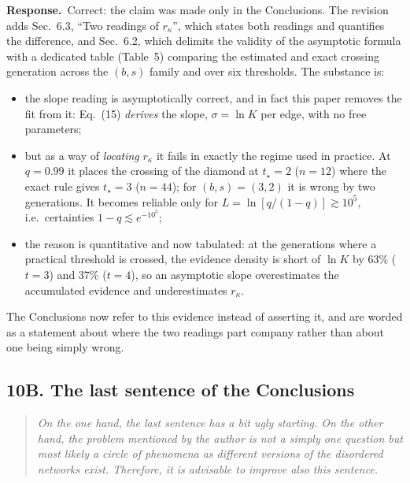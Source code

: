 \documentclass[11pt]{article}
\newcommand{\rk}{r_{\kappa}}
\newenvironment{point}{\begin{quote}\itshape}{\end{quote}}
\newcommand{\reply}{\par\noindent\textbf{Response.}\ }
\begin{document}
\reply Correct: the claim was made only in the Conclusions. The revision adds
Sec.~6.3, ``Two readings of $\rk$'', which states both readings and quantifies
the difference, and Sec.~6.2, which delimits the validity of the asymptotic
formula with a dedicated table (Table~5) comparing the estimated and exact
crossing generation across the $(b,s)$ family and over six thresholds. The
substance is:

\begin{itemize}
\item the slope reading is asymptotically correct, and in fact this paper
      removes the fit from it: Eq.~(15) \emph{derives} the slope, $\sigma=\ln
      K$ per edge, with no free parameters;
\item but as a way of \emph{locating} $\rk$ it fails in exactly the regime used
      in practice. At $q=0.99$ it places the crossing of the diamond at
      $t_\star=2$ ($n=12$) where the exact rule gives $t_\star=3$ ($n=44$); for
      $(b,s)=(3,2)$ it is wrong by two generations. It becomes reliable only
      for $L=\ln[q/(1-q)]\gtrsim10^5$, i.e.\ certainties $1-q\lesssim
      e^{-10^5}$;
\item the reason is quantitative and now tabulated: at the generations where a
      practical threshold is crossed, the evidence density is short of $\ln K$
      by $63\%$ ($t=3$) and $37\%$ ($t=4$), so an asymptotic slope
      overestimates the accumulated evidence and underestimates $\rk$.
\end{itemize}

The Conclusions now refer to this evidence instead of asserting it, and are
worded as a statement about where the two readings part company rather than
about one being simply wrong.

\subsection*{10B. The last sentence of the Conclusions}

\begin{point}
On the one hand, the last sentence has a bit ugly starting. On the other hand,
the problem mentioned by the author is not a simply one question but most
likely a circle of phenomena as different versions of the disordered networks
exist. Therefore, it is advisable to improve also this sentence.
\end{point}
\end{document}
